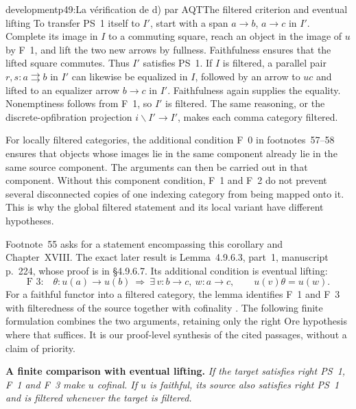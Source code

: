 \begin{dcomment}{development}{p49:La vérification de d) par AQT}{The filtered criterion and eventual lifting}
To transfer PS~1 itself to $I'$, start with a span $a\longrightarrow b$, $a\longrightarrow c$ in $I'$. Complete its image in $I$ to a commuting square, reach an object in the image of $u$ by F~1, and lift the two new arrows by fullness. Faithfulness ensures that the lifted square commutes. Thus $I'$ satisfies PS~1. If $I$ is filtered, a parallel pair $r,s:a\rightrightarrows b$ in $I'$ can likewise be equalized in $I$, followed by an arrow to $u c$ and lifted to an equalizer arrow $b\longrightarrow c$ in $I'$. Faithfulness again supplies the equality. Nonemptiness follows from F~1, so $I'$ is filtered. The same reasoning, or the discrete-opfibration projection $i\backslash I'\longrightarrow I'$, makes each comma category filtered.

For locally filtered categories, the additional condition F~0 in footnotes~57--58 ensures that objects whose images lie in the same component already lie in the same source component. The arguments can then be carried out in that component. Without this component condition, F~1 and F~2 do not prevent several disconnected copies of one indexing category from being mapped onto it. This is why the global filtered statement and its local variant have different hypotheses.

Footnote~55 asks for a statement encompassing this corollary and Chapter~XVIII. The exact later result is Lemma~4.9.6.3, part~1, manuscript p.~224, whose proof is in \S4.9.6.7. Its additional condition is eventual lifting:
\[
 \text{F~3:}\quad
 \theta:u(a)\longrightarrow u(b)
 \ \Longrightarrow\
 \exists\,v:b\longrightarrow c,\ w:a\longrightarrow c,
 \qquad u(v)\theta=u(w).
\]
For a faithful functor into a filtered category, the lemma identifies F~1 and F~3 with filteredness of the source together with cofinality \citep[Lemma~4.9.6.3(1), pp.~81--82]{Grothendieck1990XVIII}. The following finite formulation combines the two arguments, retaining only the right Ore hypothesis where that suffices. It is our proof-level synthesis of the cited passages, without a claim of priority.

\textbf{A finite comparison with eventual lifting.}\ours
\textit{If the target satisfies right PS~1, F~1 and F~3 make $u$ cofinal. If $u$ is faithful, its source also satisfies right PS~1 and is filtered whenever the target is filtered.}


\end{dcomment}
